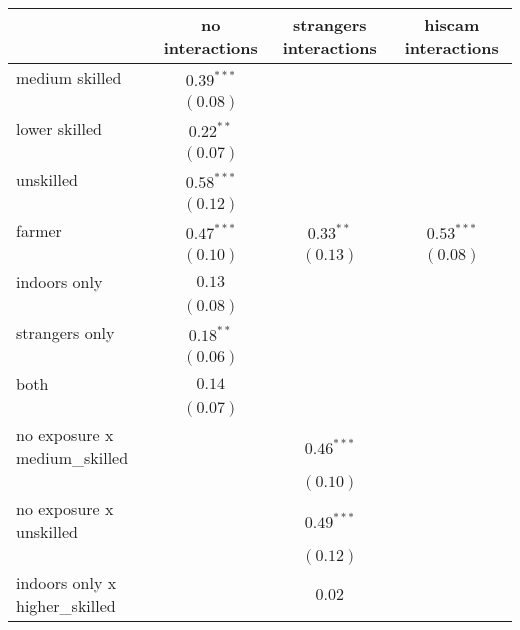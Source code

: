 
\begin{table}
\begin{center}
\begin{tabular}{l c c c}
\hline
 & no interactions & strangers interactions & hiscam interactions \\
\hline
medium skilled                   & $0.39^{***}$  &               &               \\
                                 & $(0.08)$      &               &               \\
lower skilled                    & $0.22^{**}$   &               &               \\
                                 & $(0.07)$      &               &               \\
unskilled                        & $0.58^{***}$  &               &               \\
                                 & $(0.12)$      &               &               \\
farmer                           & $0.47^{***}$  & $0.33^{**}$   & $0.53^{***}$  \\
                                 & $(0.10)$      & $(0.13)$      & $(0.08)$      \\
indoors only                     & $0.13$        &               &               \\
                                 & $(0.08)$      &               &               \\
strangers only                   & $0.18^{**}$   &               &               \\
                                 & $(0.06)$      &               &               \\
both                             & $0.14$        &               &               \\
                                 & $(0.07)$      &               &               \\
no exposure x medium\_skilled    &               & $0.46^{***}$  &               \\
                                 &               & $(0.10)$      &               \\
no exposure x unskilled          &               & $0.49^{***}$  &               \\
                                 &               & $(0.12)$      &               \\
indoors only x higher\_skilled   &               & $0.02$        &               \\

\end{tabular}
\end{center}
\end{table}
